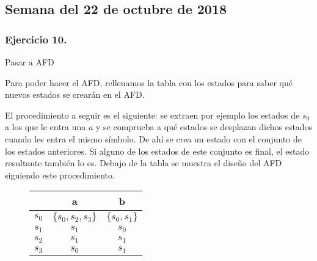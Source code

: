\documentclass[11pt,a4paper]{article}
\begin{document}
\subsection{Semana del 22 de octubre de 2018}

\subsubsection{Ejercicio 10.} Pasar a AFD

\begin{figure}[H]
\centering
{}
\end{figure}

Para poder hacer el AFD, rellenamos la tabla con los estados para saber qué nuevos estados se crearán en el AFD.

El procedimiento a seguir es el siguiente: se extraen por ejemplo los estados de $s_0$ a los que le entra una $a$ y se comprueba a qué estados se desplazan dichos estados cuando les entra el mismo símbolo. De ahí se crea un estado con el conjunto de los estados anteriores. Si alguno de los estados de este conjunto es final, el estado resultante también lo es. Debajo de la tabla se muestra el diseño del AFD siguiendo este procedimiento.

	\begin{figure}[H]
	\centering
	\begin{tabular}{|c|c c|}
		\hline
			 & a & b \\
		\hline
			$s_0$ & $\{s_0,s_2,s_3\}$ & $\{s_0,s_1\}$ \\
			$s_1$ & $s_1$ & $s_0$ \\
			$s_2$ & $s_1$ & $s_1$ \\
			$s_3$ & $s_0$ & $s_1$ \\
		\hline
	
	\end{tabular}
	\end{figure}
	
\end{document}
